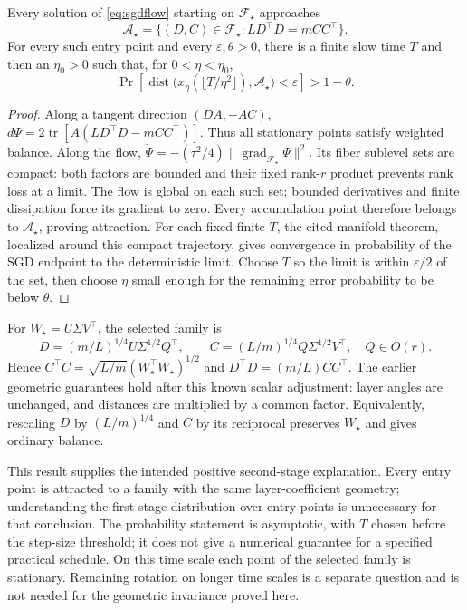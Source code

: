\begin{proposition}
Every solution of \eqref{eq:sgdflow} starting on $\mathcal F_\star$ approaches
\[
 \mathcal A_\star=\{(D,C)\in\mathcal F_\star:L D^\top D=m CC^\top\}.
\]
For every such entry point and every $\varepsilon,\theta>0$, there is a finite slow time $T$ and then an $\eta_0>0$ such that, for $0<\eta<\eta_0$,
\[
 \Pr\!\left[\operatorname{dist}\bigl(x_\eta(\lfloor T/\eta^2\rfloor),
 \mathcal A_\star\bigr)<\varepsilon\right]>1-\theta.
\]
\end{proposition}
\begin{proof}
Along a tangent direction $(DA,-AC)$,
$d\Psi=2\operatorname{tr}[A(LD^\top D-mCC^\top)]$.
Thus all stationary points satisfy weighted balance. Along the flow,
$\dot\Psi=-(\tau^2/4)\|\operatorname{grad}_{\mathcal F_\star}\Psi\|^2$.
Its fiber sublevel sets are compact: both factors are bounded and their fixed rank-$r$ product prevents rank loss at a limit. The flow is global on each such set; bounded derivatives and finite dissipation force its gradient to zero. Every accumulation point therefore belongs to $\mathcal A_\star$, proving attraction. For each fixed finite $T$, the cited manifold theorem, localized around this compact trajectory, gives convergence in probability of the SGD endpoint to the deterministic limit. Choose $T$ so the limit is within $\varepsilon/2$ of the set, then choose $\eta$ small enough for the remaining error probability to be below $\theta$.
\end{proof}

For $W_\star=U\Sigma V^\top$, the selected family is
\[
 D=(m/L)^{1/4}U\Sigma^{1/2}Q^\top,\qquad
 C=(L/m)^{1/4}Q\Sigma^{1/2}V^\top,\quad Q\in O(r).
\]
Hence $C^\top C=\sqrt{L/m}(W_\star^\top W_\star)^{1/2}$ and
$D^\top D=(m/L)CC^\top$. The earlier geometric guarantees hold after this known scalar adjustment: layer angles are unchanged, and distances are multiplied by a common factor. Equivalently, rescaling $D$ by $(L/m)^{1/4}$ and $C$ by its reciprocal preserves $W_\star$ and gives ordinary balance.

This result supplies the intended positive second-stage explanation. Every entry point is attracted to a family with the same layer-coefficient geometry; understanding the first-stage distribution over entry points is unnecessary for that conclusion. The probability statement is asymptotic, with $T$ chosen before the step-size threshold; it does not give a numerical guarantee for a specified practical schedule. On this time scale each point of the selected family is stationary. Remaining rotation on longer time scales is a separate question and is not needed for the geometric invariance proved here.

